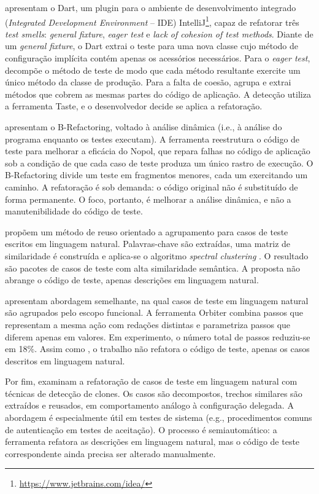  apresentam o Dart, um plugin para o ambiente de desenvolvimento integrado (\textit{Integrated Development Environment} -- IDE) IntelliJ\footnote{\url{https://www.jetbrains.com/idea/}}, capaz de refatorar três \textit{test smells}: \textit{general fixture}, \textit{eager test} e \textit{lack of cohesion of test methods}. Diante de um \textit{general fixture}, o Dart extrai o teste para uma nova classe cujo método de configuração implícita contém apenas os acessórios necessários. Para o \textit{eager test}, decompõe o método de teste de modo que cada método resultante exercite um único método da classe de produção. Para a falta de coesão, agrupa e extrai métodos que cobrem as mesmas partes do código de aplicação. A detecção utiliza a ferramenta Taste, e o desenvolvedor decide se aplica a refatoração.

 apresentam o B-Refactoring, voltado à análise dinâmica (i.e., à análise do programa enquanto os testes executam). A ferramenta reestrutura o código de teste para melhorar a eficácia do Nopol, que repara falhas no código de aplicação sob a condição de que cada caso de teste produza um único rastro de execução. O B-Refactoring divide um teste em fragmentos menores, cada um exercitando um caminho. A refatoração é sob demanda: o código original não é substituído de forma permanente. O foco, portanto, é melhorar a análise dinâmica, e não a manutenibilidade do código de teste.

 propõem um método de reuso orientado a agrupamento para casos de teste escritos em linguagem natural. Palavras-chave são extraídas, uma matriz de similaridade é construída e aplica-se o algoritmo \textit{spectral clustering} \cite{vonluxburg:2007}. O resultado são pacotes de casos de teste com alta similaridade semântica. A proposta não abrange o código de teste, apenas descrições em linguagem natural.

 apresentam abordagem semelhante, na qual casos de teste em linguagem natural são agrupados pelo escopo funcional. A ferramenta Orbiter combina passos que representam a mesma ação com redações distintas e parametriza passos que diferem apenas em valores. Em experimento, o número total de passos reduziu-se em 18\%. Assim como , o trabalho não refatora o código de teste, apenas os casos descritos em linguagem natural.

Por fim,  examinam a refatoração de casos de teste em linguagem natural com técnicas de detecção de clones. Os casos são decompostos, trechos similares são extraídos e reusados, em comportamento análogo à configuração delegada. A abordagem é especialmente útil em testes de sistema (e.g., procedimentos comuns de autenticação em testes de aceitação). O processo é semiautomático: a ferramenta refatora as descrições em linguagem natural, mas o código de teste correspondente ainda precisa ser alterado manualmente.

